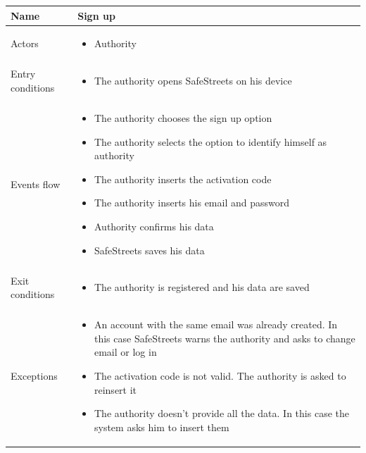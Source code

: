 \documentclass[a4paper]{article}
\begin{document}
\begin{table}[H]
\centering
\begin{tabularx}{\textwidth}{|l|X|}
\hline
Name & Sign up\tabularnewline
\hline
Actors &
\begin{itemize}[nosep,leftmargin=*]
\item Authority
\end{itemize}
\tabularnewline
\hline
Entry conditions &
\begin{itemize}[nosep,leftmargin=*]
\item The authority opens SafeStreets on his device
\end{itemize}
\tabularnewline
\hline
Events flow &
\begin{itemize}[nosep,leftmargin=*]
\item The authority chooses the sign up option
\item The authority selects the option to identify himself as authority
\item The authority inserts the activation code
\item The authority inserts his email and password
\item Authority confirms his data
\item SafeStreets saves his data
\end{itemize}
\tabularnewline
\hline
Exit conditions &
\begin{itemize}[nosep,leftmargin=*]
\item The authority is registered and his data are saved
\end{itemize}
\tabularnewline
\hline
Exceptions &
\begin{itemize}[nosep,leftmargin=*]
\item An account with the same email was already created. In this case
SafeStreets warns the authority and asks to change email or log in
\item The activation code is not valid. The authority is asked to reinsert
it
\item The authority doesn't provide all the data. In this case the system
asks him to insert them
\end{itemize}
\tabularnewline
\hline
\end{tabularx}
\end{table}
\end{document}
